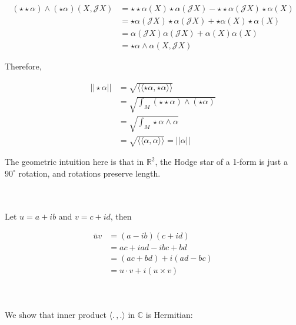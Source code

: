 \documentclass{article}
\def\cJ{\mathcal{J}}
\def\R{\mathbb{R}}
\def\R{\mathbb{R}}
\def\C{\mathbb{C}}
\begin{document}
\vspace{1.8cm}
\\\\


\begin{align*}
    (\star \star \alpha) \wedge (\star \alpha) (X, \cJ X) &= \star \star \alpha(X) \star \alpha(\cJ X) - \star \star \alpha(\cJ X) \star \alpha(X) \\
        &= \star \alpha(\cJ X) \star \alpha(\cJ X) + \star \alpha(X) \star \alpha(X) \\
        &= \alpha(\cJ X) \alpha(\cJ X) + \alpha(X) \alpha(X) \\
        &= \star \alpha \wedge \alpha (X, \cJ X)
\end{align*}

Therefore, 

\begin{align*}
    ||\star \alpha|| &= \sqrt{\langle \langle \star \alpha, \star \alpha \rangle \rangle} \\
        &= \sqrt{\int_M (\star \star \alpha) \wedge (\star \alpha)} \\
        &= \sqrt{\int_M \star \alpha \wedge \alpha} \\
        &= \sqrt{\langle \langle \alpha, \alpha \rangle \rangle} = ||\alpha||
\end{align*}

The geometric intuition here is that in $\R^2$, the Hodge star of a 1-form is just a $90^\circ$ rotation,
and rotations preserve length.


\vspace{1.8cm}
\\\\


Let $u = a + i b$ and $v = c + i d$, then

\begin{align*}
    \bar{u} v &= (a - i b) (c + i d) \\
        &= ac + i ad - i bc + bd \\
        &= (ac + bd) + i (ad - bc) \\
        &= u \cdot v + i (u \times v)
\end{align*}


\vspace{1.8cm}
\\\\


We show that inner product $\langle. \,, .\rangle$ in $\C$ is Hermitian:
\end{document}

